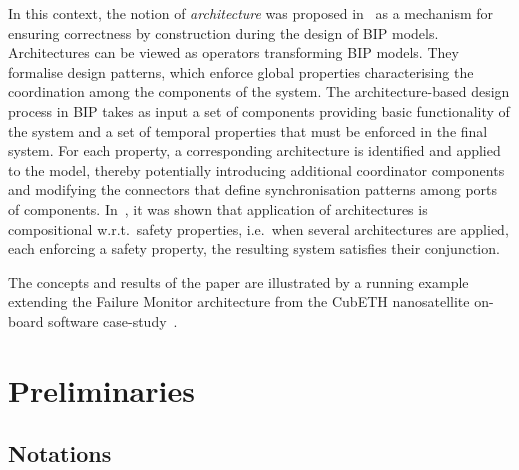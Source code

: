 \documentclass{llncs}
\newcommand{\ie}[1][\ ]{i.e.#1}
\newcommand{\eg}[1][\ ]{e.g.#1}
\newcommand{\wrt}[1][\ ]{w.r.t.#1}
\begin{document}
In this context, the notion of \emph{architecture} was proposed
in~\cite{AttieBBJS16-architectures-faoc} as a mechanism for ensuring
correctness by construction during the design of BIP models.
Architectures can be viewed as operators transforming BIP models.
They formalise design patterns, which enforce global properties
characterising the coordination among the components of the system.
The architecture-based design process in BIP takes as input a set of
components providing basic functionality of the system and a set of
temporal properties that must be enforced in the final system.  For
each property, a corresponding architecture is identified
and applied to the model, thereby potentially introducing additional
coordinator components and modifying the connectors that define
synchronisation patterns among ports of components.
In~\cite{AttieBBJS16-architectures-faoc}, it was shown that
application of architectures is compositional \wrt safety properties,
\ie when several architectures are applied, each enforcing a safety
property, the resulting system satisfies their conjunction.

The concepts and results of the paper are illustrated by a running
example extending the Failure Monitor architecture from the CubETH
nanosatellite on-board software case-study~\cite{CubETH-case-study}.


\section{Preliminaries}
\label{secn:preliminaries}


\subsection{Notations}
\label{secn:notations}
\end{document}
